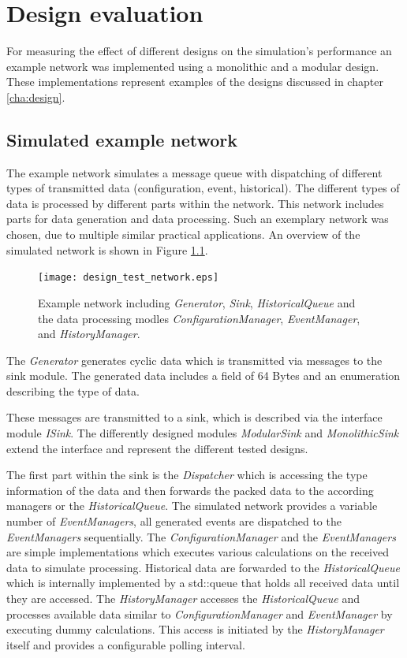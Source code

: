 \chapter{Design evaluation}
\label{cha:measurements}
For measuring the effect of different designs on the simulation's performance an example network was implemented using a monolithic and a modular design.
These implementations represent examples of the designs discussed in chapter \ref{cha:design}.


\section{Simulated example network}
\label{sec:measurements_network}
The example network simulates a message queue with dispatching of different types of transmitted data (configuration, event, historical).
The different types of data is processed by different parts within the network.
This network includes parts for data generation and data processing.
Such an exemplary network was chosen, due to multiple similar practical applications.
An overview of the simulated network is shown in Figure \ref{fig:design_test_network}.

\begin{figure}
    \centering
    \texttt{[image: design\_test\_network.eps]}
    \caption{Example network including \emph{Generator}, \emph{Sink}, \emph{HistoricalQueue} and the data processing modles \emph{ConfigurationManager}, \emph{EventManager}, and \emph{HistoryManager}.}
    \label{fig:design_test_network}
\end{figure}

The \emph{Generator} generates cyclic data which is transmitted via messages to the sink module.
The generated data includes a field of 64 Bytes and an enumeration describing the type of data.

These messages are transmitted to a sink, which is described via the interface module \emph{ISink}.
The differently designed modules \emph{ModularSink} and \emph{MonolithicSink} extend the interface and represent the different tested designs.

The first part within the sink is the \emph{Dispatcher} which is accessing the type information of the data and then forwards the packed data to the according managers or the \emph{HistoricalQueue}.
The simulated network provides a variable number of \emph{EventManagers}, all generated events are dispatched to the \emph{EventManagers} sequentially.
The \emph{ConfigurationManager} and the \emph{EventManagers} are simple implementations which executes various calculations on the received data to simulate processing.
Historical data are forwarded to the \emph{HistoricalQueue} which is internally implemented by a std::queue that holds all received data until they are accessed.
The \emph{HistoryManager} accesses the \emph{HistoricalQueue} and processes available data similar to \emph{ConfigurationManager} and \emph{EventManager} by executing dummy calculations.
This access is initiated by the \emph{HistoryManager} itself and provides a configurable polling interval.
\\

